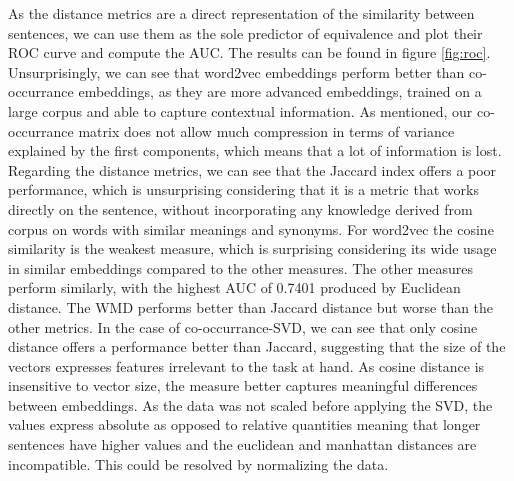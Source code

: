 \documentclass[11pt,a4paper]{article}
\begin{document}
As the distance metrics are a direct representation of the similarity between sentences, we can use them as the sole predictor of equivalence and plot their ROC curve and compute the AUC. The results can be found in figure \ref{fig:roc}. Unsurprisingly, we can see that word2vec embeddings perform better than co-occurrance embeddings, as they are more advanced embeddings, trained on a large corpus and able to capture contextual information. As mentioned, our co-occurrance matrix does not allow much compression in terms of variance explained by the first components, which means that a lot of information is lost. Regarding the distance metrics, we can see that the Jaccard index offers a poor performance, which is unsurprising considering that it is a metric that works directly on the sentence, without incorporating any knowledge derived from corpus on words with similar meanings and synonyms. For word2vec the cosine similarity is the weakest measure, which is surprising considering its wide usage in similar embeddings compared to the other measures. The other measures perform similarly, with the highest AUC of 0.7401 produced by Euclidean distance. The WMD performs better than Jaccard distance but worse than the other metrics. In the case of co-occurrance-SVD, we can see that only cosine distance offers a performance better than Jaccard, suggesting that the size of the vectors expresses features irrelevant to the task at hand. As cosine distance is insensitive to vector size, the measure better captures meaningful differences between embeddings. As the data was not scaled before applying the SVD, the values express absolute as opposed to relative quantities meaning that longer sentences have higher values and the euclidean and manhattan distances are incompatible. This could be resolved by normalizing the data.
\end{document}
